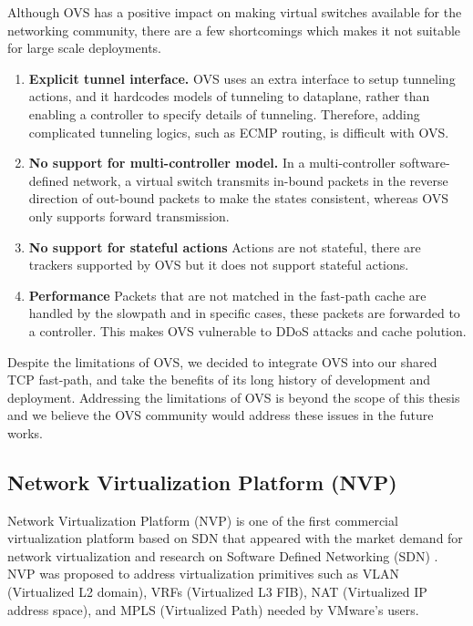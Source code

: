 Although OVS has a positive impact on making virtual switches available for the networking 
community, there are a few shortcomings which makes it not suitable for large scale 
deployments.

\begin{enumerate}
    \item \textbf{Explicit tunnel interface.} OVS uses an extra interface to setup tunneling
    actions, and it hardcodes models of tunneling to dataplane, rather than enabling
    a controller to specify details of tunneling. Therefore, adding complicated tunneling 
    logics, such as ECMP routing, is difficult with OVS. 

    \item \textbf{No support for multi-controller model.} In a multi-controller 
    software-defined network, a virtual switch transmits in-bound packets in the reverse 
    direction of out-bound packets to make the states consistent, whereas OVS only supports forward transmission. 

    \item \textbf{No support for stateful actions} Actions are not stateful, there are 
    trackers supported by OVS but it does not support stateful actions. %

    \item \textbf{Performance} Packets that are not matched in the fast-path cache are 
    handled by the slowpath and in specific cases, these packets are forwarded to a 
    controller. This makes OVS vulnerable to DDoS attacks and cache polution.  %

\end{enumerate}

Despite the limitations of OVS, we decided to integrate OVS into our shared TCP fast-path,
and take the benefits of its long history of development and deployment. Addressing 
the limitations of OVS is beyond the scope of this thesis and we believe the OVS community would
address these issues in the future works. 

\subsection{Network Virtualization Platform (NVP)}
\label{nvp}
Network Virtualization Platform (NVP) is one of the first commercial virtualization 
platform based on SDN that appeared with the market demand for network virtualization
and research on Software Defined Networking (SDN) \cite{koponen2014network}. NVP was proposed 
to address virtualization primitives such as VLAN (Virtualized L2 domain), 
VRFs (Virtualized L3 FIB), NAT 
(Virtualized IP address space), and MPLS (Virtualized Path) needed by VMware's users.

